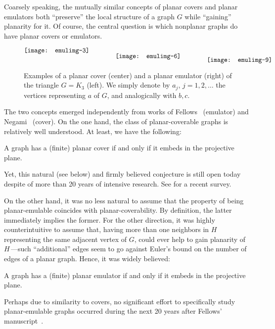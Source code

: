 \documentclass[envcountsect,envcountsame]{llncs}
\begin{document}
Coarsely speaking, the mutually similar concepts of planar covers and planar
emulators both ``preserve'' the local structure of a graph $G$ while ``gaining''
planarity for it. Of course, the central question is which nonplanar graphs do
have planar covers or emulators.

\begin{figure}
$$
\raise 3mm\hbox{\texttt{[image: emulimg-3]}}
\qquad\qquad
\texttt{[image: emulimg-6]}
\qquad\qquad
\lower 2mm\hbox{\texttt{[image: emulimg-9]}}
\vspace{-1ex}$$
\caption{Examples of a planar cover (center) and a planar emulator (right) of the triangle
$G=K_3$ (left).
We simply denote by $a_j$, $j=1,2,\dots$ the vertices representing $a$ of
$G$, and analogically with $b,c$.
}
\label{fig:emulcoverexample}
\end{figure}

The two concepts emerged independently from works of
Fellows~\cite{cit:fellows,cit:femul} (emulator) and 
Negami~\cite{cit:double,cit:conjecture,cit:negsinica} (cover).
On the one hand, the class of planar-coverable graphs is relatively well
understood. At least, we have the following:

\begin{conj}
\label{conj:negami}
A graph has a (finite) planar cover if and only if it embeds in the projective plane.
\end{conj}
Yet, this natural (see below) and firmly believed conjecture is still open today
despite of more than 20 years of intensive research.
See \cite{cit:20years} for a recent survey.

On the other hand, 
it was no less natural to assume \cite{cit:fellows,cit:femul} that
the property of being planar-emulable coincides with 
planar-coverability. By definition, the latter immediately implies the former.
For the other direction, it was highly counterintuitive
to assume that, having more than one neighbors in $H$ representing the same
adjacent vertex of $G$,
could ever help to gain planarity of~$H$\,---such ``additional'' 
edges seem to go against Euler's bound on the number of edges of a planar graph.
Hence, it was widely believed:

\begin{conj}
\label{conj:fellows}
A graph has a (finite) planar emulator if and only if it embeds in the projective plane.
\end{conj}
Perhaps due to similarity to covers, no significant effort to
specifically study planar-emulable graphs occurred during the next 20 years after Fellows' manuscript~\cite{cit:femul}.
\end{document}
